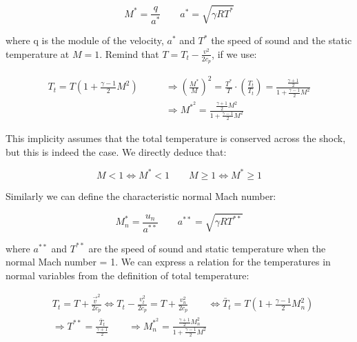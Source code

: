 \documentclass[british,french,11pt, a4paper, openany]{article}
\begin{document}
\begin{equation}
M^* = \frac{q}{a^*} \qquad a^* = \sqrt{\gamma R T^*}
\end{equation}

where q is the module of the velocity, $a^*$ and $T^*$ the speed of sound and the static temperature at $M=1$. Remind that $T = T_t - \frac{v^2}{2c_p}$, if we use: 

\begin{equation}
\begin{aligned}
T_t = T \left(1+ \frac{\gamma - 1}{2}M^2 \right) \qquad &\Rightarrow \left( \frac{M^*}{M}\right)^2 = \frac{T^*}{T} \cdot \left( \frac{T_t}{T_t}\right) = \frac{\frac{\gamma + 1}{2}}{1+ \frac{\gamma -1}{2}M^2}\\
&\Rightarrow M^{*^2} =  \frac{\frac{\gamma + 1}{2}M^2}{1+ \frac{\gamma -1}{2}M^2}
\end{aligned}
\label{eq:8.74}
\end{equation}

This implicity assumes that the total temperature is conserved across the shock, but this is indeed the case. We directly deduce that: 

\begin{equation}
M < 1 \Leftrightarrow M^* <1 \qquad M \geq 1 \Leftrightarrow M^* \geq 1
\label{eq:8.75}
\end{equation}

Similarly we can define the characteristic normal Mach number: 

\begin{equation}
M^*_n = \frac{u_n }{a^{**}} \qquad a^{**}  = \sqrt{\gamma R T^{**}}
\end{equation}

where $a^{**}$ and $T^{**}$ are the speed of sound and static temperature when the normal Mach number = 1. We can express a relation for the temperatures in normal variables from the definition of total temperature: 

\begin{equation}
\begin{aligned}
&T_t = T + \frac{\vec{v}^2}{2c_p} \Leftrightarrow T_t - \frac{v_t^2}{2c_p} = T + \frac{v_n^2}{2c_p}\qquad \Leftrightarrow \bar{T}_t = T\left(1 + \frac{\gamma -1}{2}M^2_n \right)\\
&\Rightarrow T^{**}= \frac{\bar{T}_t}{\frac{\gamma +1}{2}}\qquad \Rightarrow M^{*^2}_n = \frac{\frac{\gamma +1}{2}M^2_n}{1+ \frac{\gamma -1}{2}M^2}
\end{aligned}
\end{equation}
\end{document}
